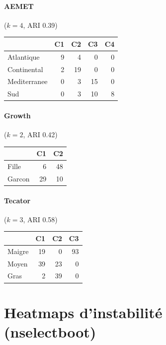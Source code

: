 \documentclass[11pt, a4paper]{article}
\begin{document}
\paragraph{AEMET} ($k=4$, ARI 0.39)
\begin{center}
\small
\begin{tabular}{lrrrr}
\toprule
& C1 & C2 & C3 & C4 \\
\midrule
Atlantique & 9 & 4 & 0 & 0 \\
Continental & 2 & 19 & 0 & 0 \\
Mediterranee & 0 & 3 & 15 & 0 \\
Sud & 0 & 3 & 10 & 8 \\
\bottomrule
\end{tabular}
\end{center}

\paragraph{Growth} ($k=2$, ARI 0.42)
\begin{center}
\small
\begin{tabular}{lrr}
\toprule
& C1 & C2 \\
\midrule
Fille & 6 & 48 \\
Garcon & 29 & 10 \\
\bottomrule
\end{tabular}
\end{center}

\paragraph{Tecator} ($k=3$, ARI 0.58)
\begin{center}
\small
\begin{tabular}{lrrr}
\toprule
& C1 & C2 & C3 \\
\midrule
Maigre & 19 & 0 & 93 \\
Moyen & 39 & 23 & 0 \\
Gras & 2 & 39 & 0 \\
\bottomrule
\end{tabular}
\end{center}

\section{Heatmaps d'instabilité (nselectboot)}
\end{document}
